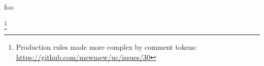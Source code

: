 %
%
%


foo

\footnote{Production rules made more complex by comment tokens: \url{https://github.com/mewmew/uc/issues/30}}

